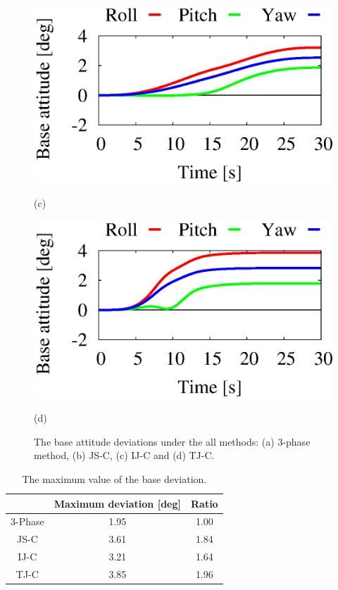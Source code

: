 \begin{figure}[t]
\begin{minipage}[h]{0.4\linewidth}
    \centering
    \includegraphics[width=1.0\linewidth]{fig/chapter4/PTP/IJ-C/X02_Base_Orientation.eps}
    \footnotesize\par{(c)}
  \end{minipage}
  \begin{minipage}[h]{0.4\linewidth}
    \centering
    \includegraphics[width=1.0\linewidth]{fig/chapter4/PTP/TJ-C/X02_Base_Orientation.eps}
    \footnotesize\par{(d)}
  \end{minipage}
  \caption{The base attitude deviations under the all methods:
  (a) 3-phase method, (b) JS-C, (c) IJ-C and (d) TJ-C.}
  \label{fig:RES_COMP_PTP}
\end{figure}
%
\begin{table}[t]
  \centering
  \caption{The maximum value of the base deviation.}
  \begin{tabular}[h]{c|c|c}\hline
    & Maximum deviation [deg] & Ratio \\\hline\hline
    3-Phase & 1.95 & 1.00\\\hline
    JS-C & 3.61 & 1.84 \\\hline
    IJ-C & 3.21 & 1.64 \\\hline
    TJ-C & 3.85 & 1.96 \\\hline
  \end{tabular}
  \label{tab:RES_COMP_PTP}
\end{table}

